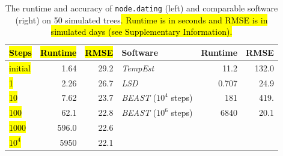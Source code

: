 \documentclass{bioinfo}
\newcommand{\code}[1]{{\tt #1}}
\newcommand{\edit}[1]{\hl{#1}}
\begin{document}

\begin{table}[t]
	\caption[Runtime and accuracy]{The runtime and accuracy of \code{node.dating} (left) and comparable software (right) on 50 simulated trees\edit{. Runtime is in seconds and RMSE is in simulated days (see Supplementary Information).} }
	\label{tab:runtime}
	\centering
	\begin{tabular}{lrr|lrr}
		\hline
		\edit{Steps} & \edit{Runtime} & \edit{RMSE} & Software & Runtime\edit{ } & RMSE\edit{ } \\
		\hline
		\edit{initial} & 1.64 & 29.2 & \emph{TempEst} & 11.2 & 132.0 \\
		\edit{1} & 2.26 & 26.7 & \emph{LSD} & 0.707 & 24.9 \\
		\edit{10} & 7.62 & 23.7 & \emph{BEAST} ($10^4$ steps) & 181 & 419. \\
		\edit{100} & 62.1 & 22.8 & \emph{BEAST} ($10^6$ steps) & 6840 & 20.1 \\
		\edit{1000} & 596.0 & 22.6 & & & \\
		\edit{$10^4$} & 5950 & 22.1 & & & \\
		\hline
	\end{tabular}
	\vspace{-5pt}
\end{table}
\end{document}
